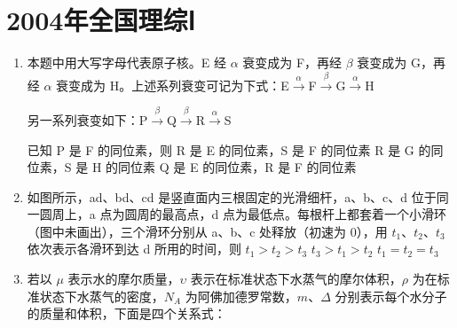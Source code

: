 \documentclass[\gkver]{gaokaozhenti}
\begin{document}
\chapter{2004年全国理综Ⅰ}

\begin{enumerate}
\item
本题中用大写字母代表原子核。E 经 $\alpha$ 衰变成为 F，再经 $\beta$ 衰变成为 G，再经 $\alpha$ 衰变成为 H。上述系列衰变可记为下式：E$\xrightarrow{\alpha}$F$\xrightarrow{\beta}$G$\xrightarrow{\alpha}$H

另一系列衰变如下：P$\xrightarrow{\beta}$Q$\xrightarrow{\beta}$R$\xrightarrow{\alpha}$S

已知 P 是 F 的同位素，则
{R 是 E 的同位素，S 是 F 的同位素}
{R 是 G 的同位素，S 是 H 的同位素}
{Q 是 E 的同位素，R 是 F 的同位素}


\item
如图所示，ad、bd、cd 是竖直面内三根固定的光滑细杆，a、b、c、d 位于同一圆周上，a 点为圆周的最高点，d 点为最低点。每根杆上都套着一个小滑环（图中未画出），三个滑环分别从 a、b、c 处释放（初速为 0），用 $t_{1}$、$t_{2}$、$t_{3}$ 依次表示各滑环到达 d 所用的时间，则
{$t_{1}>t_{2}>t_{3}$}
{$t_{3}>t_{1}>t_{2}$}
{$t_{1}=t_{2}=t_{3}$}


\item
若以 $\mu$ 表示水的摩尔质量，$\upsilon$ 表示在标准状态下水蒸气的摩尔体积，$\rho$ 为在标准状态下水蒸气的密度，$N_{A}$ 为阿佛加德罗常数，$m$、$\Delta$ 分别表示每个水分子的质量和体积，下面是四个关系式：


\end{enumerate}
\end{document}
